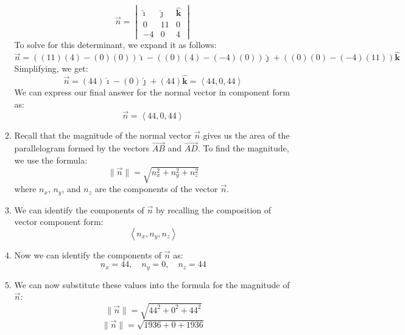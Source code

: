 \documentclass[12pt]{article} %
\numberwithin{equation}{section}
\begin{document}
\begin{enumerate}[label=\roman*.]
\begin{enumerate}[label=\arabic*.]
                    \[
                    \vec{n} = \begin{vmatrix}
                    \boldsymbol{\hat{\imath}} & \boldsymbol{\hat{\jmath}} & \boldsymbol{\hat{k}} \\
                    0 & 11 & 0 \\
                    -4 & 0 & 4
                    \end{vmatrix}
                    \]
                    To solve for this determinant, we expand it as follows:
                    \[
                    \vec{n} = ((11) (4) - (0) (0))\boldsymbol{\hat{\imath}} - ((0) (4) - (-4) (0))\boldsymbol{\hat{\jmath}} + ((0) (0) - (-4) (11))\boldsymbol{\hat{k}}
                    \]
                    Simplifying, we get:
                    \[
                    \vec{n} = (44)\boldsymbol{\hat{\imath}} - (0)\boldsymbol{\hat{\jmath}} + (44)\boldsymbol{\hat{k}} = \left\langle 44, 0, 44 \right\rangle
                    \]
                    We can express our final answer for the normal vector in component form as:
                    \[
                    \boxed{\vec{n} = \left\langle 44, 0, 44 \right\rangle}
                    \]
                \item Recall that the magnitude of the normal vector \(\vec{n}\) gives us the area of the parallelogram formed by the vectors \(\overrightarrow{AB}\) and \(\overrightarrow{AD}\).
                    To find the magnitude, we use the formula:
                    \[
                    \lVert \vec{n} \rVert = \sqrt{n_x^2 + n_y^2 + n_z^2}
                    \]
                    where \(n_x\), \(n_y\), and \(n_z\) are the components of the vector \(\vec{n}\).
                \item We can identify the components of \(\vec{n}\) by recalling the composition of vector component form:
                    \[
                    \left\langle n_x, n_y, n_z \right\rangle
                    \]
                \item Now we can identify the components of \(\vec{n}\) as:
                    \[
                    n_x = 44, \quad n_y = 0, \quad n_z = 44
                    \]
                \item We can now substitute these values into the formula for the magnitude of \(\vec{n}\):
                    \[
                    \lVert \vec{n} \rVert = \sqrt{44^2 + 0^2 + 44^2}
                    \]
                    \[
                    \lVert \vec{n} \rVert = \sqrt{1936 + 0 + 1936}
                    \]
                    \[
\]
\end{enumerate}
\end{enumerate}
\end{document}
